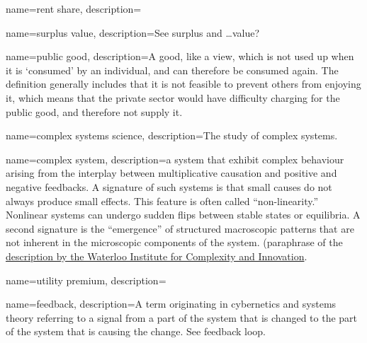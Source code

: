 





{
name=rent share,
description={}
}

{
name=surplus value,
description={See \gls{surplus} and \dots value?}
}

{
name=public good,
description={A good, like a view, which is not used up when it is `consumed' by an individual, and can therefore be consumed again. The definition generally includes that it is not feasible to prevent others from enjoying it, which means that the private sector would have difficulty charging for the public good, and therefore not supply it.   }
}

{
name=complex systems science,
description={The study of \glspl{complex system}.}
}

{
name=complex system,
description={a system that exhibit complex behaviour arising from the interplay between multiplicative causation and positive and negative feedbacks.  A signature of such systems is that small causes do not always produce small effects. This feature is often called “non-linearity.” Nonlinear systems can undergo sudden flips between stable states or equilibria. A second signature is the “emergence” of structured macroscopic patterns that are not inherent in the  microscopic components of the system. (paraphrase of the \href{https://uwaterloo.ca/complexity-innovation/about/what-are-complex-systems}{description by the Waterloo Institute for Complexity and Innovation}.}
}

{
name=utility premium,
description={}
}

{
name=feedback,
description={A term originating in cybernetics and systems theory referring to a signal from a part of the system that is changed to the part of the system that is causing the change. See \gls{feedback loop}. }
}

